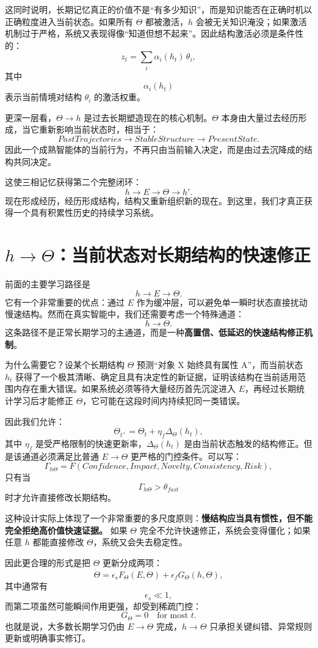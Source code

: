 这同时说明，长期记忆真正的价值不是“有多少知识”，而是知识能否在正确时机以正确粒度进入当前状态。如果所有 $\Theta$ 都被激活，$h$ 会被无关知识淹没；如果激活机制过于严格，系统又表现得像“知道但想不起来”。因此结构激活必须是条件性的：
\[
z_t
=
\sum_i
\alpha_i(h_t)\,
\theta_i,
\]
其中
\[
\alpha_i(h_t)
\]
表示当前情境对结构 $\theta_i$ 的激活权重。

更深一层看，$\Theta\rightarrow h$ 是过去长期塑造现在的核心机制。$\Theta$ 本身由大量过去经历形成，当它重新影响当前状态时，相当于：
\[
PastTrajectories
\rightarrow
StableStructure
\rightarrow
PresentState.
\]
因此一个成熟智能体的当前行为，不再只由当前输入决定，而是由过去沉降成的结构共同决定。

这使三相记忆获得第二个完整闭环：
\[
h
\rightarrow
E
\rightarrow
\Theta
\rightarrow
h'.
\]
现在形成经历，经历形成结构，结构又重新组织新的现在。到这里，我们才真正获得一个具有积累性历史的持续学习系统。

\section{$h\rightarrow\Theta$：当前状态对长期结构的快速修正}

前面的主要学习路径是
\[
h\rightarrow E\rightarrow\Theta.
\]
它有一个非常重要的优点：通过 $E$ 作为缓冲层，可以避免单一瞬时状态直接扰动慢速结构。然而在真实智能中，我们还需要考虑一个特殊通道：
\[
\boxed{
h\rightarrow\Theta.
}
\]
这条路径不是正常长期学习的主通道，而是一种\textbf{高置信、低延迟的快速结构修正机制}。

为什么需要它？设某个长期结构 $\Theta$ 预测“对象 X 始终具有属性 A”，而当前状态 $h_t$ 获得了一个极其清晰、确定且具有决定性的新证据，证明该结构在当前适用范围内存在重大错误。如果系统必须等待大量经历首先沉淀进入 $E$，再经过长期统计学习后才能修正 $\Theta$，它可能在这段时间内持续犯同一类错误。

因此我们允许：
\[
\Theta_{t^+}
=
\Theta_t
+
\eta_f
\Delta_\Theta(h_t),
\]
其中 $\eta_f$ 是受严格限制的快速更新率，$\Delta_\Theta(h_t)$ 是由当前状态触发的结构修正。但是该通道必须满足比普通 $E\rightarrow\Theta$ 更严格的门控条件。可以写：
\[
\Gamma_{h\Theta}
=
F(
Confidence,
Impact,
Novelty,
Consistency,
Risk
),
\]
只有当
\[
\Gamma_{h\Theta}
>
\theta_{fast}
\]
时才允许直接修改长期结构。

这种设计实际上体现了一个非常重要的多尺度原则：\textbf{慢结构应当具有惯性，但不能完全拒绝高价值快速证据。} 如果 $\Theta$ 完全不允许快速修正，系统会变得僵化；如果任意 $h$ 都能直接修改 $\Theta$，系统又会失去稳定性。

因此更合理的形式是把 $\Theta$ 更新分成两项：
\[
\dot\Theta
=
\epsilon_s
F_\Theta(E,\Theta)
+
\epsilon_f
G_\Theta(h,\Theta),
\]
其中通常有
\[
\epsilon_s
\ll 1,
\]
而第二项虽然可能瞬间作用更强，却受到稀疏门控：
\[
G_\Theta
=
0
\quad
\text{for most }t.
\]
也就是说，大多数长期学习仍由 $E\rightarrow\Theta$ 完成，$h\rightarrow\Theta$ 只承担关键纠错、异常规则更新或明确事实修订。

